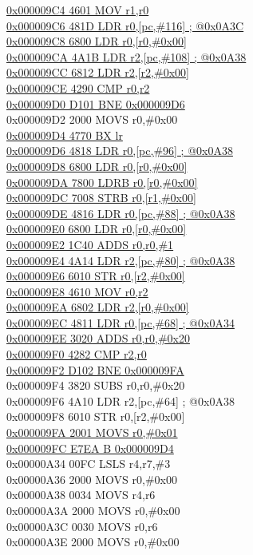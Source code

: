 \documentclass[11pt]{article}
\begin{document}
\underline{0x000009C4 4601 MOV r1,r0}\\
\underline{0x000009C6 481D LDR r0,[pc,\#116] ; @0x0A3C}\\
\underline{0x000009C8 6800 LDR r0,[r0,\#0x00]}\\
\underline{0x000009CA 4A1B LDR r2,[pc,\#108] ; @0x0A38}\\
\underline{0x000009CC 6812 LDR r2,[r2,\#0x00]}\\
\underline{0x000009CE 4290 CMP r0,r2}\\
\underline{0x000009D0 D101 BNE 0x000009D6}\\
0x000009D2 2000 MOVS r0,\#0x00\\
\underline{0x000009D4 4770 BX lr}\\
\underline{0x000009D6 4818 LDR r0,[pc,\#96] ; @0x0A38}\\
\underline{0x000009D8 6800 LDR r0,[r0,\#0x00]}\\
\underline{0x000009DA 7800 LDRB r0,[r0,\#0x00]}\\
\underline{0x000009DC 7008 STRB r0,[r1,\#0x00]}\\
\underline{0x000009DE 4816 LDR r0,[pc,\#88] ; @0x0A38}\\
\underline{0x000009E0 6800 LDR r0,[r0,\#0x00]}\\
\underline{0x000009E2 1C40 ADDS r0,r0,\#1}\\
\underline{0x000009E4 4A14 LDR r2,[pc,\#80] ; @0x0A38}\\
\underline{0x000009E6 6010 STR r0,[r2,\#0x00]}\\
\underline{0x000009E8 4610 MOV r0,r2}\\
\underline{0x000009EA 6802 LDR r2,[r0,\#0x00]}\\
\underline{0x000009EC 4811 LDR r0,[pc,\#68] ; @0x0A34}\\
\underline{0x000009EE 3020 ADDS r0,r0,\#0x20}\\
\underline{0x000009F0 4282 CMP r2,r0}\\
\underline{0x000009F2 D102 BNE 0x000009FA}\\
0x000009F4 3820 SUBS r0,r0,\#0x20\\
0x000009F6 4A10 LDR r2,[pc,\#64] ; @0x0A38\\
0x000009F8 6010 STR r0,[r2,\#0x00]\\
\underline{0x000009FA 2001 MOVS r0,\#0x01}\\
\underline{0x000009FC E7EA B 0x000009D4}\\[.25in]
0x00000A34 00FC LSLS r4,r7,\#3\\
0x00000A36 2000 MOVS r0,\#0x00\\
0x00000A38 0034 MOVS r4,r6\\
0x00000A3A 2000 MOVS r0,\#0x00\\
0x00000A3C 0030 MOVS r0,r6\\
0x00000A3E 2000 MOVS r0,\#0x00
\end{document}
